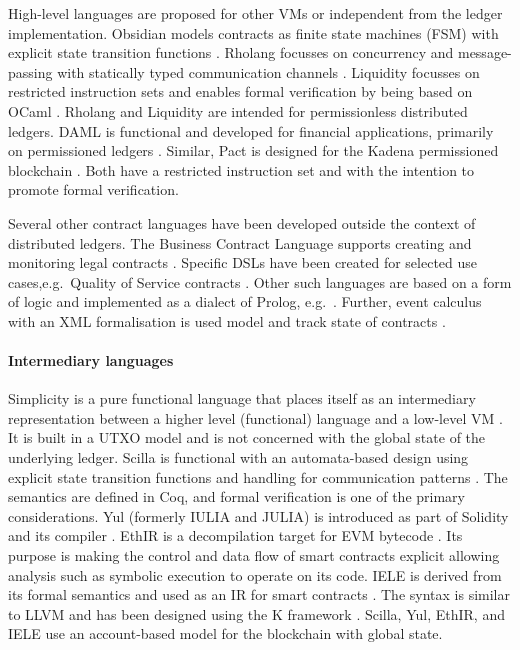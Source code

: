 High-level languages are proposed for other VMs or independent from the ledger implementation.
Obsidian models contracts as finite state machines (FSM) with explicit state transition functions \cite{Coblenz2017}.
Rholang focusses on concurrency and message-passing with statically typed communication channels \cite{Meredith2018}.
Liquidity focusses on restricted instruction sets and enables formal verification by being based on OCaml \cite{OCamlProSAS2018}.
Rholang and Liquidity are intended for permissionless distributed ledgers.
DAML is functional and developed for financial applications, primarily on permissioned ledgers \cite{Shaul2018,Meier2018,Lippmeier2018,Huschenbett2018,Bernauer2018,Maric2018,Bleikertz2018,Lochbihler2018,Pilav2018}.
Similar, Pact is designed for the Kadena permissioned blockchain \cite{Popejoy2017}.
Both have a restricted instruction set and with the intention to promote formal verification.

Several other contract languages have been developed outside the context of distributed ledgers. The Business Contract Language supports creating and monitoring legal contracts \cite{Neal.2003,Governatori2006}. Specific DSLs have been created for selected use cases,e.g.\, Quality of Service contracts \cite{Braga2009}.
Other such languages are based on a form of logic and implemented as a dialect of Prolog, e.g.\ \cite{Michael2010}.
Further, event calculus with an XML formalisation is used model and track state of contracts \cite{Farrell2004}.

\paragraph{Intermediary languages}
Simplicity is a pure functional language that places itself as an intermediary representation between a higher level (functional) language and a low-level VM \cite{OConnor2017}. 
It is built in a UTXO model and is not concerned with the global state of the underlying ledger.
Scilla is functional with an automata-based design using explicit state transition functions and handling for communication patterns \cite{Sergey2018}. The semantics are defined in Coq, and formal verification is one of the primary considerations.
Yul (formerly IULIA and JULIA) is introduced as part of Solidity and its compiler \cite{EthereumFoundation2018IULIA}. 
EthIR is a decompilation target for EVM bytecode \cite{Albert2018}. Its purpose is making the control and data flow of smart contracts explicit allowing analysis such as symbolic execution to operate on its code. 
IELE is derived from its formal semantics and used as an IR for smart contracts \cite{Kasampalis2018}. The syntax is similar to LLVM and has been designed using the K framework \cite{Rosu2007}.
Scilla, Yul, EthIR, and IELE use an account-based model for the blockchain with global state.

